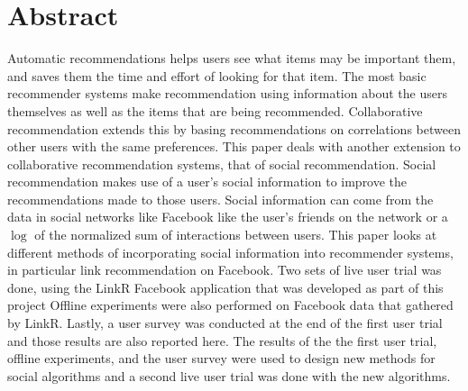 \chapter*{Abstract}

Automatic recommendations helps users see what items may be important them, and saves them the time and effort of looking for that item. The most basic recommender systems make recommendation using information about the users themselves as well as the items that are being recommended. Collaborative recommendation extends this by basing recommendations on correlations between other users with the same preferences. This paper deals with another extension to collaborative recommendation systems, that of social recommendation. Social recommendation makes use of a user's social information to improve the recommendations made to those users. Social information can come from the data in social networks like Facebook like the user's friends on the network or a $\log$ of the normalized sum of interactions between users. This paper looks at different methods of incorporating social information into recommender systems, in particular link recommendation on Facebook. Two sets of live user trial was done, using the LinkR Facebook application that was developed as part of this project  Offline experiments were also performed on Facebook data that gathered by LinkR. Lastly, a user survey was conducted at the end of the first  user trial and those results are also reported here. The results of the the first user trial, offline experiments, and the user survey were used to design new methods for social algorithms and a second live user trial was done with the new algorithms.
